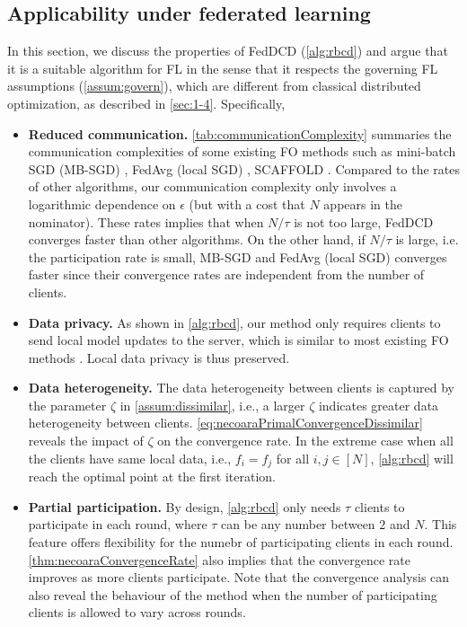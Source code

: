 \subsection{Applicability under federated learning}
In this section, we discuss the properties of FedDCD (\autoref{alg:rbcd}) and argue that it is a suitable algorithm for FL in the sense that it respects the governing FL assumptions (\autoref{assum:govern}), which are different from classical distributed optimization, as described in \autoref{sec:1-4}. Specifically, 
\begin{itemize}
    \item \textbf{Reduced communication.} 
    \autoref{tab:communicationComplexity} summaries the communication complexities of some existing FO methods such as mini-batch SGD (MB-SGD) \citep{WoodworthPS20}, FedAvg (local SGD) \citep{mcmahan2017communication}, SCAFFOLD \citep{pmlr-v119-karimireddy20a}. Compared to the rates of other algorithms, our communication complexity only involves a logarithmic dependence on $\epsilon$ (but with a cost that $N$ appears in the nominator). These rates implies that when $N/\tau$ is not too large, FedDCD converges faster than other algorithms.
    On the other hand, if $N/\tau$ is large, i.e. the participation rate is small, MB-SGD and FedAvg (local SGD) converges faster since their convergence rates are independent from the number of clients. 
    \item \textbf{Data privacy.} As shown in \autoref{alg:rbcd}, our method only requires clients to send local model updates to the server, which is similar to most existing FO methods \citep{mcmahan2017communication,li2018federated,yuan2021federated,karimireddy2020mime}. Local data privacy is thus preserved. 
    \item \textbf{Data heterogeneity.} 
    The data heterogeneity between clients is captured by the parameter $\zeta$ in \autoref{assum:dissimilar}, i.e., a larger $\zeta$ indicates greater data heterogeneity between clients. \autoref{eq:necoaraPrimalConvergenceDissimilar} reveals the impact of $\zeta$ on the convergence rate. In the extreme case when all the clients have same local data, i.e., $f_i = f_j$ for all $i,j \in [N]$, \autoref{alg:rbcd} will reach the optimal point at the first iteration.
    \item \textbf{Partial participation.} By design, \autoref{alg:rbcd} only needs $\tau$ clients to participate in each round, where $\tau$ can be any number between $2$ and $N$. This feature offers flexibility for the numebr of participating clients in each round. \autoref{thm:necoaraConvergenceRate} also implies that the convergence rate improves as more clients participate. Note that the convergence analysis can also reveal the behaviour of the method when the number of participating clients is allowed to vary across rounds.
\end{itemize}

